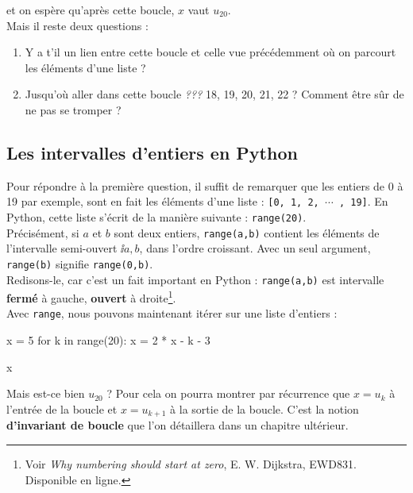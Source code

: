 et on espère qu'après cette boucle, $x$ vaut $u_{20}$. \\

Mais il reste deux questions :
\begin{enumerate}
 \item Y a t'il un lien entre cette boucle et celle vue précédemment où on parcourt les éléments 
d'une liste ?
\item Jusqu'où aller dans cette boucle 
\emph{???} 18, 19, 20, 21, 22 ? Comment être sûr de ne pas se tromper ?\\
\end{enumerate}

\subsection{Les intervalles d'entiers en Python}

Pour répondre à la première question, il suffit de remarquer que les entiers de 0 à 19 par exemple, 
sont en fait les éléments d'une liste : \texttt{[0, 1, 2, $\cdots$ , 19]}. En Python, cette liste 
s'écrit de la manière suivante : \texttt{range(20)}.\\
Précisément, si $a$ et $b$ sont deux entiers, \texttt{range(a,b)} contient les éléments de 
l'intervalle semi-ouvert $\ii{a,b}$, dans l'ordre croissant. Avec un seul argument, 
\texttt{range(b)} signifie \texttt{range(0,b)}.\\
Redisons-le, car c'est un fait important en Python : \texttt{range(a,b)} est intervalle 
\textbf{fermé} à gauche, \textbf{ouvert} à
droite\footnote{Voir \textit{Why numbering should start at zero}, E. W. Dijkstra,
  EWD831. Disponible en ligne.}.\\
  
Avec \texttt{range}, nous pouvons maintenant itérer sur une liste d'entiers :

\begin{pyconsole}
x = 5
for k in range(20):
    x = 2 * x - k - 3
  
x
\end{pyconsole}

\begin{rem}
Mais est-ce bien $u_{20}$ ? Pour cela on pourra montrer par récurrence que $x=u_k$ à l'entrée de la boucle et $x=u_{k+1}$ à la sortie de la boucle. C'est la notion \textbf{d'invariant de boucle} que l'on détaillera dans un chapitre ultérieur.
\end{rem}

